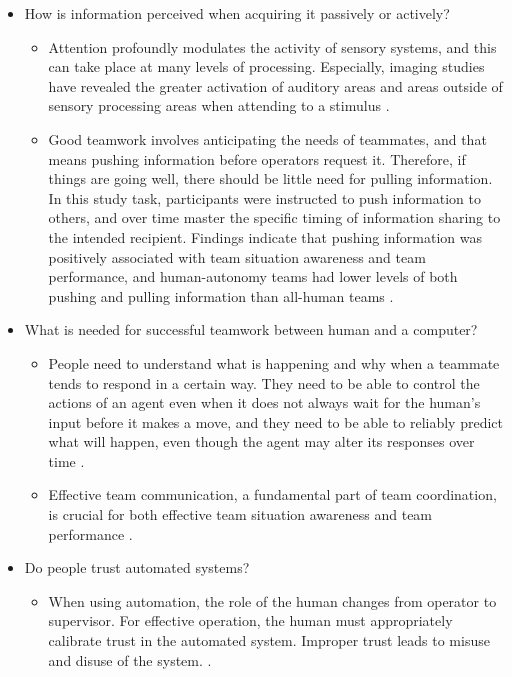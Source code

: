 \begin{itemize}
	\item How is information perceived when acquiring it passively or actively?
	\begin{itemize}
		\item Attention profoundly modulates the activity of sensory systems, and this can take place at many levels of processing. Especially, imaging studies have revealed the greater activation of auditory areas and areas outside of sensory processing areas when attending to a stimulus \cite{Palmer2007}.
		\item Good teamwork involves anticipating the needs of teammates, and that means pushing information before operators request it. Therefore, if things are going well, there should be little need for pulling information. In this study task, participants were instructed to push information to others, and over time master the specific timing of information sharing to the intended recipient. Findings indicate that pushing information was positively associated with team situation awareness and team performance, and human-autonomy teams had lower levels of both pushing and pulling information than all-human teams \cite{Demir2017}.
	\end{itemize}
	
	\item What is needed for successful teamwork between human and a computer?
	\begin{itemize}
		\item  People need to understand what is happening and why when a teammate tends to respond in a certain way. They need to be able to control the actions of an agent even when it does not always wait for the human’s input before it makes a move, and they need to be able to reliably predict what will happen, even though the agent may alter its responses over time \cite{Bradshaw2003}.
		\item Effective team communication, a fundamental part of team coordination, is crucial for both effective team situation awareness and team performance \cite{Demir2017}.
	\end{itemize}
	
	\item Do people trust automated systems?
	\begin{itemize}
		\item When using automation, the role of the human changes from operator to supervisor. For effective operation, the human must appropriately calibrate trust in the automated system. Improper trust leads to misuse and disuse of the system. \cite{Walliser2011}.
	\end{itemize}
\end{itemize}

